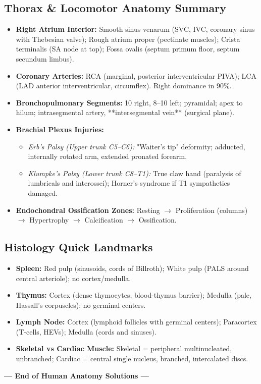 \documentclass[11pt,a4paper]{article}
\begin{document}
\subsection{Thorax \& Locomotor Anatomy Summary}
\begin{itemize}[leftmargin=*]
    \item \textbf{Right Atrium Interior:} Smooth sinus venarum (SVC, IVC, coronary sinus with Thebesian valve); Rough atrium proper (pectinate muscles); Crista terminalis (SA node at top); Fossa ovalis (septum primum floor, septum secundum limbus).
    \item \textbf{Coronary Arteries:} RCA (marginal, posterior interventricular PIVA); LCA (LAD anterior interventricular, circumflex). Right dominance in 90\%.
    \item \textbf{Bronchopulmonary Segments:} 10 right, 8--10 left; pyramidal; apex to hilum; intrasegmental artery, **intersegmental vein** (surgical plane).
    \item \textbf{Brachial Plexus Injuries:}
    \begin{itemize}
        \item \textit{Erb's Palsy (Upper trunk C5--C6):} "Waiter's tip" deformity; adducted, internally rotated arm, extended pronated forearm.
        \item \textit{Klumpke's Palsy (Lower trunk C8--T1):} True claw hand (paralysis of lumbricals and interossei); Horner's syndrome if T1 sympathetics damaged.
    \end{itemize}
    \item \textbf{Endochondral Ossification Zones:} Resting $\rightarrow$ Proliferation (columns) $\rightarrow$ Hypertrophy $\rightarrow$ Calcification $\rightarrow$ Ossification.
\end{itemize}

\subsection{Histology Quick Landmarks}
\begin{itemize}[leftmargin=*]
    \item \textbf{Spleen:} Red pulp (sinusoids, cords of Billroth); White pulp (PALS around central arteriole); no cortex/medulla.
    \item \textbf{Thymus:} Cortex (dense thymocytes, blood-thymus barrier); Medulla (pale, Hassall's corpuscles); no germinal centers.
    \item \textbf{Lymph Node:} Cortex (lymphoid follicles with germinal centers); Paracortex (T-cells, HEVs); Medulla (cords and sinuses).
    \item \textbf{Skeletal vs Cardiac Muscle:} Skeletal = peripheral multinucleated, unbranched; Cardiac = central single nucleus, branched, intercalated discs.
\end{itemize}

\vspace{1cm}
\begin{center}
\textbf{--- End of Human Anatomy Solutions ---}
\end{center}
\end{document}
